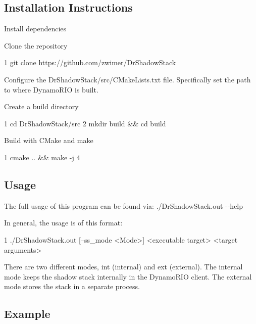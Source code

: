 \subsection*{Installation Instructions}


\begin{DoxyEnumerate}
\item Install dependencies
\item Clone the repository 
\begin{DoxyCode}
1 git clone https://github.com/zwimer/DrShadowStack
\end{DoxyCode}

\item Configure the {\ttfamily Dr\+Shadow\+Stack/src/\+C\+Make\+Lists.\+txt} file. Specifically set the path to where Dynamo\+R\+IO is built.
\item Create a build directory 
\begin{DoxyCode}
1 cd DrShadowStack/src
2 mkdir build && cd build
\end{DoxyCode}

\item Build with C\+Make and make 
\begin{DoxyCode}
1 cmake .. && make -j 4
\end{DoxyCode}

\end{DoxyEnumerate}

\subsection*{Usage}

The full usage of this program can be found via\+: {\ttfamily ./\+Dr\+Shadow\+Stack.out -\/-\/help}

In general, the usage is of this format\+: 
\begin{DoxyCode}
1 ./DrShadowStack.out [--ss\_mode <Mode>] <executable target> <target arguments>
\end{DoxyCode}


There are two different modes, {\ttfamily int} (internal) and {\ttfamily ext} (external). The internal mode keeps the shadow stack internally in the Dynamo\+R\+IO client. The external mode stores the stack in a separate process.

\subsection*{Example}

